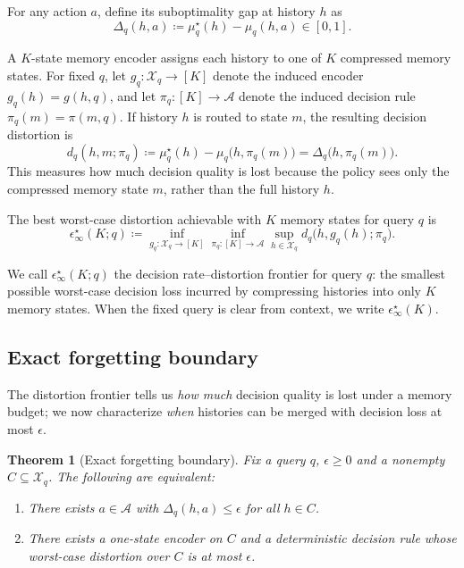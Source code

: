 \documentclass{article}
\theoremstyle{plain}
\newtheorem{theorem}{Theorem}
\theoremstyle{definition}
\theoremstyle{remark}
\newcommand{\cA}{\mathcal{A}}
\newcommand{\cX}{\mathcal{X}}
\newcommand{\eps}{\epsilon}
\begin{document}
For any action \(a\), define its suboptimality gap at history \(h\) as
\begin{equation}
\label{eq:gap}
\Delta_q(h,a)
\coloneqq
\mu_q^\star(h)-\mu_q(h,a)
\in[0,1].
\end{equation}

A \(K\)-state memory encoder assigns each history to one of \(K\)
compressed memory states. For fixed \(q\), let
\(g_q:\mathcal X_q\to[K]\) denote the induced encoder
\(g_q(h)=g(h,q)\), and let \(\pi_q:[K]\to\cA\) denote the induced
decision rule \(\pi_q(m)=\pi(m,q)\). If history \(h\) is routed to state
\(m\), the resulting decision distortion is
\begin{equation}
\label{eq:distortion}
d_q(h,m;\pi_q)
\coloneqq
\mu_q^\star(h)-\mu_q\bigl(h,\pi_q(m)\bigr)
=
\Delta_q\bigl(h,\pi_q(m)\bigr).
\end{equation}
This measures how much decision quality is lost because the policy sees
only the compressed memory state \(m\), rather than the full history \(h\).

The best worst-case distortion achievable with \(K\) memory states for
query \(q\) is
\begin{equation}
\label{eq:epsK}
\eps^\star_\infty(K;q)
\coloneqq
\inf_{g_q:\mathcal X_q\to[K]}
\inf_{\pi_q:[K]\to\cA}
\sup_{h\in\mathcal X_q}
d_q\bigl(h,g_q(h);\pi_q\bigr).
\end{equation}

We call \(\eps^\star_\infty(K;q)\) the decision rate--distortion frontier
for query \(q\): the smallest possible worst-case decision loss incurred
by compressing histories into only \(K\) memory states. When the fixed
query is clear from context, we write \(\eps^\star_\infty(K)\).
\vspace{-0.5em}
\subsection{Exact forgetting boundary}
\label{sec:forgetting}
\vspace{-0.5em}
The distortion frontier tells us \emph{how much} decision quality is lost under a memory budget; we now characterize \emph{when} histories can be merged with
decision loss at most \(\eps\).

\begin{theorem}[Exact forgetting boundary]
\label{thm:forgetting}
Fix a query \(q\), $\eps\ge 0$ and a nonempty $C\subseteq\cX_q$.
The following are equivalent:
\begin{enumerate}[nosep]
    \item There exists $a\in\cA$ with $\Delta_q(h,a)\le\eps$ for all $h\in C$.
    \item There exists a one-state encoder on \(C\) and a deterministic decision
rule whose worst-case distortion over \(C\) is at most \(\eps\).
\end{enumerate}
\end{theorem}
\end{document}
